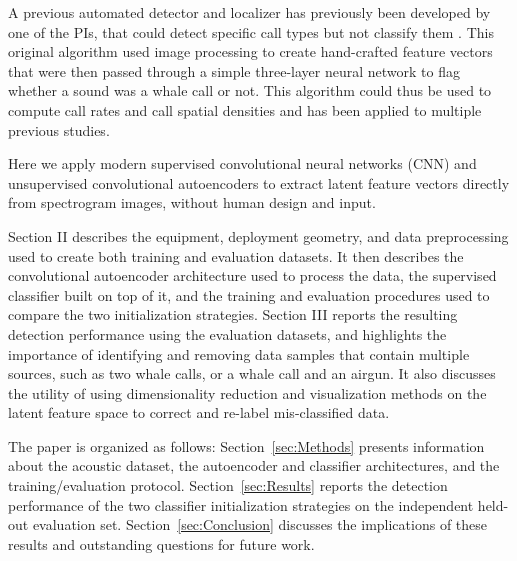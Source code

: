 \documentclass[preprint,NumberedRefs]{JASAnew}
\begin{document}
A previous automated detector and localizer has previously been developed by one of the PIs, that could detect specific call types but not classify them \cite{thode2012automated}.  This original algorithm used image processing to create hand-crafted feature vectors that were then passed through a simple three-layer neural network to flag whether a sound was a whale call or not.  This algorithm could thus be used to compute call rates and call spatial densities and has been applied to multiple previous studies\cite{thode2016source,thode2017decadal,thode2020roaring,thode2024statistical,blackwell2015effects}.  


Here we apply modern supervised convolutional neural networks (CNN) and unsupervised convolutional autoencoders\cite{guo2017deep,ozanich2021deep} to extract latent feature vectors directly from spectrogram images, without human design and input.



Section II describes the equipment, deployment geometry, and data preprocessing used to create both training and evaluation datasets.  It then describes the convolutional autoencoder architecture used to process the data, the supervised classifier built on top of it, and the training and evaluation procedures used to compare the two initialization strategies.  Section III reports the resulting detection performance using the evaluation datasets, and highlights the importance of identifying and removing data samples that contain multiple sources, such as two whale calls, or a whale call and an airgun.  It also discusses the utility of using dimensionality reduction and visualization methods on the latent feature space to correct and re-label mis-classified data. 


The paper is organized as follows: Section~\ref{sec:Methods} presents
information about the acoustic dataset, the autoencoder and classifier architectures,
and the training/evaluation protocol. Section~\ref{sec:Results} reports the detection
performance of the two classifier initialization strategies on the independent
held-out evaluation set. Section~\ref{sec:Conclusion} discusses the implications of
these results and outstanding questions for future work.
\end{document}

